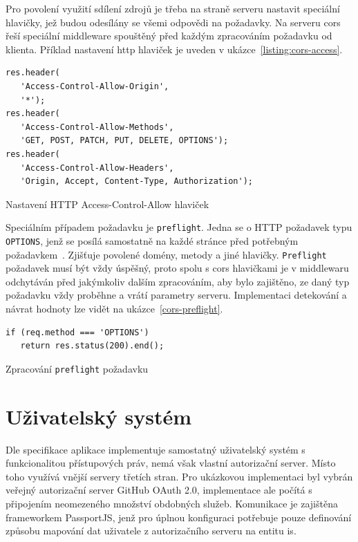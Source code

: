 Pro povolení využití sdílení zdrojů je třeba na straně serveru nastavit speciální hlavičky, jež budou odesílány se všemi odpovědi na požadavky. Na serveru \gls{cors} řeší speciální middleware spouštěný před každým zpracováním požadavku od klienta. Příklad nastavení \gls{http} hlaviček je uveden v ukázce~\ref{listing:cors-access}.


\begin{fig:code}
	\begin{verbatim}
res.header(
   'Access-Control-Allow-Origin', 
   '*');
res.header(
   'Access-Control-Allow-Methods', 
   'GET, POST, PATCH, PUT, DELETE, OPTIONS');
res.header(
   'Access-Control-Allow-Headers', 
   'Origin, Accept, Content-Type, Authorization');
   \end{verbatim}
   \caption{Nastavení HTTP Access-Control-Allow hlaviček}\label{listing:cors-access}
\end{fig:code}


Speciálním případem požadavku je \texttt{preflight}. Jedna se o HTTP požadavek typu \texttt{OPTIONS}, jenž se posílá samostatně na každé stránce před potřebným požadavkem~\cite{corsActions}. Zjišťuje povolené domény, metody a jiné hlavičky. \texttt{Preflight} požadavek musí být vždy úspěšný, proto spolu s \gls{cors} hlavičkami je v middlewaru odchytáván před jakýmkoliv dalším zpracováním, aby  bylo zajištěno, ze daný typ požadavku vždy proběhne a vrátí parametry serveru. Implementaci detekování a návrat hodnoty lze vidět na ukázce~\ref{cors-preflight}.


\begin{fig:code}
   \begin{verbatim}   
if (req.method === 'OPTIONS')
   return res.status(200).end();
   \end{verbatim}
   \caption{Zpracování \texttt{preflight} požadavku}\label{cors-preflight}
\end{fig:code}





\section{Uživatelský systém}

Dle specifikace aplikace implementuje samostatný uživatelský systém s funkcionalitou přístupových práv, nemá však vlastní autorizační server. Místo toho využívá vnější servery třetích stran. Pro ukázkovou implementaci byl vybrán veřejný autorizační server GitHub OAuth 2.0, implementace ale počítá s připojením neomezeného množství obdobných služeb. Komunikace je zajištěna frameworkem PassportJS, jenž pro úplnou konfiguraci potřebuje pouze definování způsobu mapování dat uživatele z autorizačního serveru na entitu \gls{is}. 

